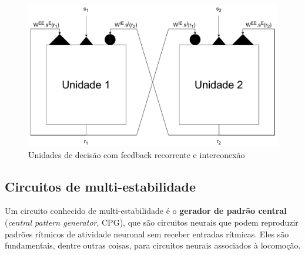 \begin{figure}[tb]
	\centering
	\caption[Unidades de decisão com feedback recorrente e interconexão]{Unidades de decisão com feedback recorrente e interconexão}
	\label{fig:unidadesdecisao}
	\includegraphics[width=0.7\linewidth]{figs/unidades_decisao}
\end{figure}


\subsection{Circuitos de multi-estabilidade}
Um circuito conhecido de multi-estabilidade é o \textbf{gerador de padrão central} (\textit{central pattern generator}, CPG), que são circuitos neurais que podem reproduzir padrões rítmicos de atividade neuronal sem receber entradas rítmicas.
Eles são fundamentais, dentre outras coisas, para circuitos neurais associados à locomoção.

